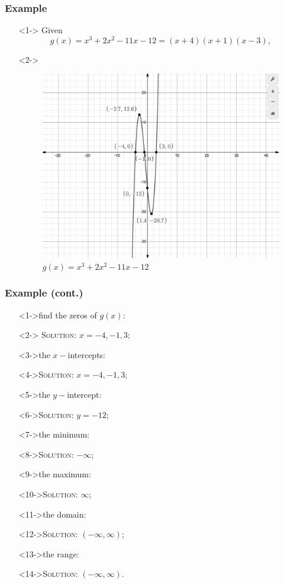 \documentclass{beamer}
\begin{document}
\begin{frame}
	\frametitle{Example} 
	\begin{enumerate} 
		\item[]<1-> Given 
		\[
			g(x)=x^{3}+2x^{2}-11x-12=(x+4)(x+1)(x-3), 
		\]
		\item[]<2-> 
		\begin{figure} 
			\begin{center}
				\caption{$g(x)=x^{3}+2x^{2}-11x-12$}
				\includegraphics[scale=0.2]{4_1_050.png} 	 	
			\end{center} 
		\end{figure} 
	\end{enumerate}
\end{frame}

\begin{frame}
	\frametitle{Example (cont.)} 
		\begin{enumerate}
			\item[]<1->find the zeros of $g(x)$: 
			\item[]<2-> \textsc{Solution:} $x=-4, -1, 3$; 
			\item[]<3->the $x-$intercepts: 
			\item[]<4->\textsc{Solution:} $x=-4, -1, 3$;  
			\item[]<5->the $y-$intercept: 
			\item[]<6->\textsc{Solution:} $y=-12$;  
			\item[]<7->the minimum:  
			\item[]<8->\textsc{Solution:} $-\infty$;  
			\item[]<9->the maximum: 
			\item[]<10->\textsc{Solution:} $\infty$;  
			\item[]<11->the domain: 
			\item[]<12->\textsc{Solution:} $(-\infty, \infty)$;  
			\item[]<13->the range: 
			\item[]<14->\textsc{Solution:} $(-\infty, \infty)$.  
		\end{enumerate}
\end{frame}
\end{document}
